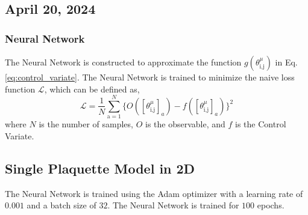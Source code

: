 \begin{center}
\section*{\creationmonth}
\end{center}

\def\day{\textit{\monthdayyeardate\today}}
\def\weekday{\textit{Tuesday}}
\subsection*{April 20, 2024}


\subsubsection*{Neural Network}
The Neural Network is constructed to approximate the function $g(\theta^{\mu}_{\text{i,j}})$ in Eq. \ref{eq:control_variate}. The Neural Network is trained to minimize the naive loss function $\mathcal{L}$, which can be defined as,
\begin{equation}
    \mathcal{L} = \frac{1}{N}\sum_{\text{a}=1}^{N}\{O([\theta^{\mu}_{\text{i,j}}]_a) - f([\theta^{\mu}_{\text{i,j}}]_a)\}^2
\end{equation} 
where $N$ is the number of samples, $O$ is the observable, and $f$ is the Control Variate. 
\subsection*{Single Plaquette Model in 2D} 

The Neural Network is trained using the Adam optimizer with a learning rate of $0.001$ and a batch size of $32$. The Neural Network is trained for $100$ epochs.